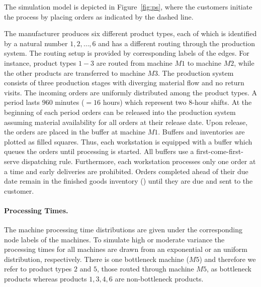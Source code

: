 \documentclass[envcountsame]{llncs}
\begin{document}


The simulation model is depicted in Figure~\ref{fig:ps}, where the customers initiate the process by
placing orders as indicated by the dashed line.
%
\begin{figure*}[t!]
  \centering
  \caption{Production System of the Simulation Model with routing, processing time distributions and
    demand interarrival time distributions.} \label{fig:ps}
\end{figure*}
%
%
The manufacturer produces six different product types, each of which is identified by a natural
number ${1,2,\ldots,6}$ and has a different routing through the production system. The routing setup
is provided by corresponding labels of the edges. For instance, product types $1-3$ are routed from
machine $M1$ to machine $M2$, while the other products are transferred to machine $M3$. The
production system consists of three production stages with diverging material flow and no return
visits.
%
The incoming orders are uniformly distributed among the product types.
%
A period lasts $960$ minutes ($=16$ hours) which represent two \(8\)-hour shifts. At the
beginning of each period orders can be released into the production system assuming material
availability for all orders at their release date. Upon release, the orders are
placed in the buffer at machine $M1$. Buffers and inventories are plotted as filled squares. Thus,
each workstation is equipped with a buffer which queues the orders until processing is started. All
buffers use a first-come-first-serve dispatching rule.
%
Furthermore, each workstation processes only one order at a time and early deliveries are
prohibited. Orders completed ahead of their due date remain in the finished goods inventory (\fgi{})
until they are due and sent to the customer.


\paragraph{Processing Times.} The machine processing time distributions are given under the
corresponding node labels of the machines. To simulate high or moderate variance the processing
times for all machines are  drawn from an exponential or an uniform distribution,
respectively. There is one bottleneck machine ($M5$) and therefore we refer to product
types $2$ and $5$, those routed through machine $M5$, as
bottleneck products whereas products $1,3,4,6$ are non-bottleneck products.
\end{document}

